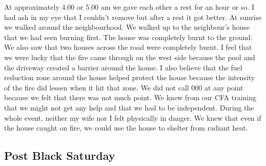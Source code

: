 \documentclass[a4paper]{article}
\begin{document}
        At approximately 4.00 or 5.00 am we gave each other a rest for an hour or so. I had ash in my eye that I couldn't remove but after a rest it got better. At sunrise we walked around the neighbourhood. We walked up to the neighbour's house that we had seen burning first. The house was completely burnt to the ground. We also saw that two houses across the road were completely burnt.
        I feel that we were lucky that the fire came through on the west side because the pool and the driveway created a barrier around the house. I also believe that the fuel reduction zone around the house helped protect the house because the intensity of the fire did lessen when it hit that zone.
        We did not call 000 at any point because we felt that there was not much point. We knew from our CFA training that we might not get any help and that we had to be independent.
        During the whole event, neither my wife nor I felt physically in danger. We knew that even if the house caught on fire, we could use the house to shelter from radiant heat.

    \subsection{Post Black Saturday}
\end{document}
